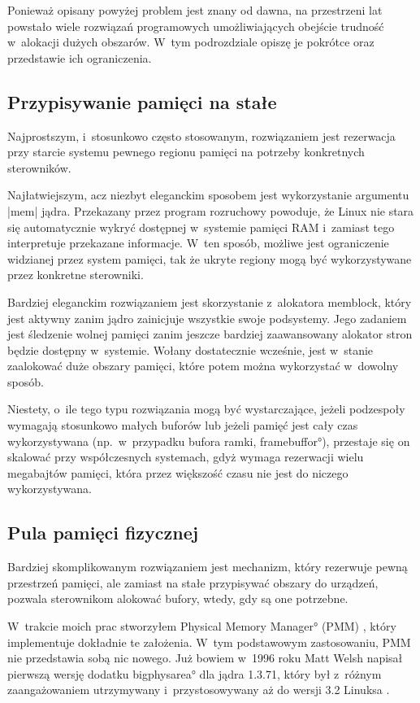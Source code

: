 Ponieważ opisany powyżej problem jest znany od dawna, na przestrzeni
lat powstało wiele rozwiązań programowych umożliwiających obejście
trudność w~alokacji dużych obszarów.  W~tym podrozdziale opiszę je
pokrótce oraz przedstawie ich ograniczenia.

\subsection{Przypisywanie pamięci na stałe}

Najprostszym, i~stosunkowo często stosowanym, rozwiązaniem jest
rezerwacja przy starcie systemu pewnego regionu pamięci na potrzeby
konkretnych sterowników.

Najłatwiejszym, acz niezbyt eleganckim sposobem jest wykorzystanie
argumentu \code|mem| jądra.  Przekazany przez program rozruchowy
powoduje, że Linux nie stara się automatycznie wykryć dostępnej
w~systemie pamięci RAM i~zamiast tego interpretuje przekazane
informacje.  W~ten sposób, możliwe jest ograniczenie widzianej przez
system pamięci, tak że ukryte regiony mogą być wykorzystywane przez
konkretne sterowniki.

Bardziej eleganckim rozwiązaniem jest skorzystanie z~alokatora
memblock, który jest aktywny zanim jądro zainicjuje wszystkie swoje
podsystemy.  Jego zadaniem jest śledzenie wolnej pamięci zanim jeszcze
bardziej zaawansowany alokator stron będzie dostępny w~systemie.
Wołany dostatecznie wcześnie, jest w~stanie zaalokować duże obszary
pamięci, które potem można wykorzystać w~dowolny sposób.

Niestety, o~ile tego typu rozwiązania mogą być wystarczające, jeżeli
podzespoły wymagają stosunkowo małych buforów lub jeżeli pamięć jest
cały czas wykorzystywana (np.\ w~przypadku bufora ramki,
\ang{framebuffor}), przestaje się on skalować przy współczesnych
systemach, gdyż wymaga rezerwacji wielu megabajtów pamięci, która
przez większość czasu nie jest do niczego wykorzystywana.

\subsection{Pula pamięci fizycznej}\label{sec:intro-pmm}

Bardziej skomplikowanym rozwiązaniem jest mechanizm, który rezerwuje
pewną przestrzeń pamięci, ale zamiast na stałe przypisywać obszary do
urządzeń, pozwala sterownikom alokować bufory, wtedy, gdy są one
potrzebne.

W~trakcie moich prac stworzyłem \ang*{Physical Memory Manager} (PMM)
\autocite{patch:pmm}, który implementuje dokładnie te założenia. W~tym
podstawowym zastosowaniu, PMM nie przedstawia sobą nic nowego.  Już
bowiem w~1996 roku Matt Welsh napisał pierwszą wersję dodatku
\ang*{bigphysarea} dla jądra 1.3.71, który był z~różnym zaangażowaniem
utrzymywany i~przystosowywany aż do wersji 3.2 Linuksa
\autocite{patch:bigphys}.

